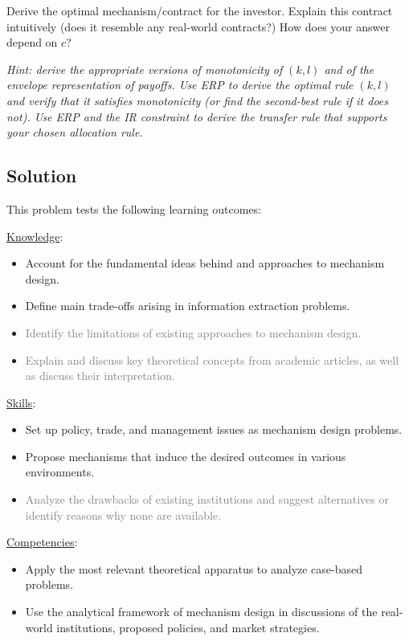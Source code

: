 \documentclass[a4paper]{article}
\newif\ifsolutions
\begin{document}
	Derive the optimal mechanism/contract for the investor. Explain this contract intuitively (does it resemble any real-world contracts?) How does your answer depend on $c$? 
	
	\emph{Hint: derive the appropriate versions of monotonicity of $(k,l)$ and of the envelope representation of payoffs. Use ERP to derive the optimal rule $(k,l)$ and verify that it satisfies monotonicity (or find the second-best rule if it does not). Use ERP and the IR constraint to derive the transfer rule that supports your chosen allocation rule.}


\ifsolutions
\subsection*{Solution}
	This problem tests the following learning outcomes:
	\begin{framed}
		\underline{Knowledge}:
		\begin{itemize}[$\circ$]
			\item {Account for the fundamental ideas behind and approaches to mechanism design.}
			\item {Define main trade-offs arising in information extraction problems.}
			\item \textcolor{gray}{Identify the limitations of existing approaches to mechanism design.}
			\item \textcolor{gray}{Explain and discuss key theoretical concepts from academic articles, as well as discuss their interpretation.}
		\end{itemize}
		\underline{Skills}:
		\begin{itemize}[$\circ$]
			\item {Set up policy, trade, and management issues as mechanism design problems.}
			\item {Propose mechanisms that induce the desired outcomes in various environments.}
			\item \textcolor{gray}{Analyze the drawbacks of existing institutions and suggest alternatives or identify reasons why none are available.}
		\end{itemize}
		\underline{Competencies}:
		\begin{itemize}[$\circ$]
			\item {Apply the most relevant theoretical apparatus to analyze case-based problems.}
			\item {Use the analytical framework of mechanism design in discussions of the real-world institutions, proposed policies, and market strategies.}
		\end{itemize}
	\end{framed}
	
\end{document}
